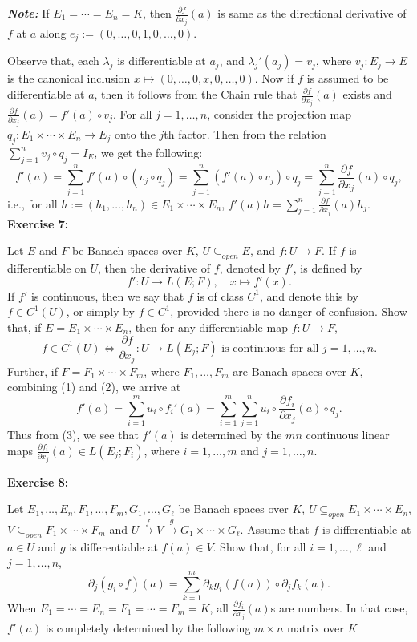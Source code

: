 \documentclass{book}
\begin{document}
\textbf{\textit{Note:}} If $E_1 = \cdots = E_n = K$, then $\frac{\partial f}{\partial x_j}(a)$ is same as the directional derivative of $f$ at $a$ along $e_j := (0, \ldots, 0, 1, 0, \ldots, 0)$.

Observe that, each $\lambda_j$ is differentiable at $a_j$, and $\lambda_j'(a_j) = v_j$, where $v_j : E_j \to E$ is the canonical inclusion $x \mapsto (0, \ldots, 0, x, 0, \ldots, 0)$. Now if $f$ is assumed to be differentiable at $a$, then it follows from the Chain rule that $\frac{\partial f}{\partial x_j}(a)$ exists and $\frac{\partial f}{\partial x_j}(a) = f'(a) \circ v_j$. For all $j = 1, \ldots, n$, consider the projection map $q_j : E_1 \times \cdots \times E_n \to E_j$ onto the $j$th factor. Then from the relation $\sum_{j=1}^{n} v_j \circ q_j = I_E$, we get the following:
\[
f'(a)
=
\sum_{j=1}^{n} f'(a) \circ (v_j \circ q_j)
=
\sum_{j=1}^{n} (f'(a) \circ v_j) \circ q_j
=
\sum_{j=1}^{n} \frac{\partial f}{\partial x_j}(a) \circ q_j,
\tag{2}
\]
i.e., for all $h := (h_1, \ldots, h_n) \in E_1 \times \cdots \times E_n$, $f'(a)h = \sum_{j=1}^{n} \frac{\partial f}{\partial x_j}(a) h_j$.
\newpage
\textbf{Exercise 7:}

Let $E$ and $F$ be Banach spaces over $K$, $U \subseteq_{open} E$, and $f : U \to F$. If $f$ is differentiable on $U$, then the derivative of $f$, denoted by $f'$, is defined by
\[
f' : U \to L(E; F), \quad x \mapsto f'(x).
\]
If $f'$ is continuous, then we say that $f$ is of class $C^1$, and denote this by $f \in C^1(U)$, or simply by $f \in C^1$, provided there is no danger of confusion. Show that, if $E = E_1 \times \cdots \times E_n$, then for any differentiable map $f : U \to F$,
\[
f \in C^1(U) \Longleftrightarrow \frac{\partial f}{\partial x_j} : U \to L(E_j; F) \text{ is continuous for all } j = 1, \ldots, n.
\]
Further, if $F = F_1 \times \cdots \times F_m$, where $F_1, \ldots, F_m$ are Banach spaces over $K$, combining (1) and (2), we arrive at
\[
f'(a)
=
\sum_{i=1}^{m} u_i \circ f_i'(a)
=
\sum_{i=1}^{m} \sum_{j=1}^{n} u_i \circ \frac{\partial f_i}{\partial x_j}(a) \circ q_j.
\tag{3}
\]
Thus from (3), we see that $f'(a)$ is determined by the $mn$ continuous linear maps $\frac{\partial f_i}{\partial x_j}(a) \in L(E_j; F_i)$, where $i = 1, \ldots, m$ and $j = 1, \ldots, n$.

\textbf{Exercise 8:}

Let $E_1, \ldots, E_n, F_1, \ldots, F_m, G_1, \ldots, G_\ell$ be Banach spaces over $K$, $U \subseteq_{open} E_1 \times \cdots \times E_n$, $V \subseteq_{open} F_1 \times \cdots \times F_m$ and $U \xrightarrow{f} V \xrightarrow{g} G_1 \times \cdots \times G_\ell$. Assume that $f$ is differentiable at $a \in U$ and $g$ is differentiable at $f(a) \in V$. Show that, for all $i = 1, \ldots, \ell$ and $j = 1, \ldots, n$,
\[
\partial_j (g_i \circ f)(a)
=
\sum_{k=1}^{m} \partial_k g_i(f(a)) \circ \partial_j f_k(a).
\]
When $E_1 = \cdots = E_n = F_1 = \cdots = F_m = K$, all $\frac{\partial f_i}{\partial x_j}(a)$s are numbers. In that case, $f'(a)$ is completely determined by the following $m \times n$ matrix over $K$
\end{document}
